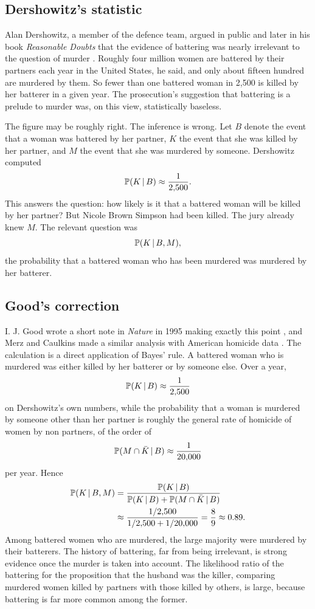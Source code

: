 \subsection{Dershowitz's statistic}

Alan Dershowitz, a member of the defence team, argued in public and later in his book \emph{Reasonable Doubts} that the evidence of battering was nearly irrelevant to the question of murder \citep{dershowitz1996}. Roughly four million women are battered by their partners each year in the United States, he said, and only about fifteen hundred are murdered by them. So fewer than one battered woman in 2,500 is killed by her batterer in a given year. The prosecution's suggestion that battering is a prelude to murder was, on this view, statistically baseless.

The figure may be roughly right. The inference is wrong. Let $B$ denote the event that a woman was battered by her partner, $K$ the event that she was killed by her partner, and $M$ the event that she was murdered by someone. Dershowitz computed
\[
\mathbb{P}(K \,\vert\, B) \approx \frac{1}{2{,}500}.
\]
This answers the question: how likely is it that a battered woman will be killed by her partner? But Nicole Brown Simpson had been killed. The jury already knew $M$. The relevant question was
\[
\mathbb{P}(K \,\vert\, B, M),
\]
the probability that a battered woman who has been murdered was murdered by her batterer.

\subsection{Good's correction}

I. J. Good wrote a short note in \emph{Nature} in 1995 making exactly this point \citep{good1995}, and Merz and Caulkins made a similar analysis with American homicide data \citep{merz1995}. The calculation is a direct application of Bayes' rule. A battered woman who is murdered was either killed by her batterer or by someone else. Over a year,
\[
\mathbb{P}(K \,\vert\, B) \approx \frac{1}{2{,}500}
\]
on Dershowitz's own numbers, while the probability that a woman is murdered by someone other than her partner is roughly the general rate of homicide of women by non partners, of the order of
\[
\mathbb{P}(M\cap\bar K \,\vert\, B) \approx \frac{1}{20{,}000}
\]
per year. Hence
\begin{equation}
\begin{split}
\mathbb{P}(K\,\vert\, B, M) &= \frac{\mathbb{P}(K\,\vert\, B)}{\mathbb{P}(K\,\vert\, B) + \mathbb{P}(M \cap \bar K \,\vert\, B)}\\
&\approx \frac{1/2{,}500}{1/2{,}500 + 1/20{,}000} = \frac{8}{9} \approx 0.89 .
\end{split}
\label{eq:simpson}
\end{equation}
Among battered women who are murdered, the large majority were murdered by their batterers. The history of battering, far from being irrelevant, is strong evidence once the murder is taken into account. The likelihood ratio of the battering for the proposition that the husband was the killer, comparing murdered women killed by partners with those killed by others, is large, because battering is far more common among the former.

